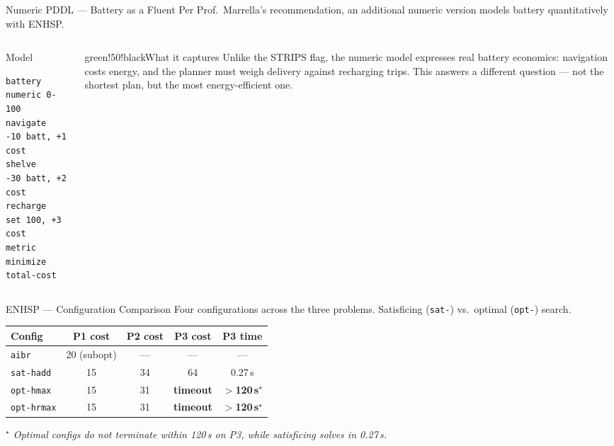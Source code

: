 \documentclass{beamer}
\begin{document}
\begin{frame}[fragile]{Numeric PDDL --- Battery as a Fluent}
Per Prof.\ Marrella's recommendation, an additional numeric version models
battery quantitatively with ENHSP.

\vspace{0.6em}
\begin{columns}
\begin{column}{0.46\textwidth}
\begin{block}{Model}
\begin{lstlisting}
battery    numeric 0-100
navigate   -10 batt, +1 cost
shelve     -30 batt, +2 cost
recharge   set 100, +3 cost
metric     minimize total-cost
\end{lstlisting}
\end{block}
\end{column}
\begin{column}{0.50\textwidth}
\begin{colorblock}[white]{green!50!black}{What it captures}
Unlike the STRIPS flag, the numeric model expresses real battery economics:
navigation costs energy, and the planner must weigh delivery against
recharging trips. This answers a different question --- not the shortest plan,
but the most energy-efficient one.
\end{colorblock}
\end{column}
\end{columns}
\end{frame}

\begin{frame}{ENHSP --- Configuration Comparison}
Four configurations across the three problems. Satisficing (\texttt{sat-}) vs.\
optimal (\texttt{opt-}) search.

\vspace{0.6em}
\begin{center}
\small
\begin{tabular}{lcccc}
\toprule
\textbf{Config} & \textbf{P1 cost} & \textbf{P2 cost} & \textbf{P3 cost} & \textbf{P3 time}\\
\midrule
\texttt{aibr}      & 20 (subopt) & ---  & ---     & ---\\
\texttt{sat-hadd}  & 15 & 34 & 64 & 0.27\,s\\
\texttt{opt-hmax}  & 15 & 31 & \textcolor{maincolor}{\textbf{timeout}} & \textcolor{maincolor}{\textbf{$>$120\,s$^\star$}}\\
\texttt{opt-hrmax} & 15 & 31 & \textcolor{maincolor}{\textbf{timeout}} & \textcolor{maincolor}{\textbf{$>$120\,s$^\star$}}\\
\bottomrule
\end{tabular}
\end{center}

\vspace{0.5em}
{\small\itshape\color{maincolor}$^\star$ Optimal configs do not terminate
within 120\,s on P3, while satisficing solves in 0.27\,s.}
\end{frame}
\end{document}
